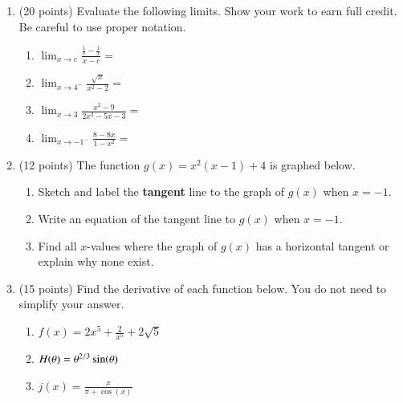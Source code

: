 \documentclass[12pt]{article}
\renewcommand{\emph}[1]{\textsf{\textbf{#1}}}
\let\ds\displaystyle
\begin{document}
\begin{enumerate}
\newpage
\item (20 points) Evaluate the following limits. Show your work to earn full credit. Be careful to use proper notation.
	\begin{enumerate}
	\item $\displaystyle{\lim_{x \to c } \frac{\frac{1}{c}-\frac{1}{x}}{x-c}= }$
	\vfill
	\item $\displaystyle{\lim_{x \to 4^-} \frac{\sqrt{x}}{x^2 -2} =}$
	\vfill
	\item $\ds \lim_{x \to 3} \frac{x^2-9}{2x^2-5x-3}=$
	\vfill
	\item $\ds \lim_{x \to -1^-} \frac{8-8x}{1-x^2}=$ 
	\vfill
	\end{enumerate}

\newpage

\item (12 points) The function $g(x)=x^2(x-1)+4$ is graphed below.

\vspace{0.5in}
	\begin{enumerate}
	\item Sketch and label the \emph{tangent} line to the graph of $g(x)$ when $x=-1.$ \\
	
	\item Write an equation of the tangent line to $g(x)$ when $x=-1.$
	\vfill
	\item Find all $x$-values where the graph of $g(x)$ has a horizontal tangent or explain why none exist.
	\vfill
	\end{enumerate}


\newpage

\item (15 points) Find the derivative of each function below. You do not need to simplify your answer. 
	\begin{enumerate}
	\item $f(x)=2x^{5}+\frac{2}{x^5}+2\sqrt{5}$
	\vfill
	\item $H(\theta)= \theta^{\small{2/3}} \sin(\theta)$
	\vfill
	\item $j(x)=\frac{x}{\pi+\cos(x)}$
	\vfill
	\end{enumerate}
	

\end{enumerate}
\end{document}
